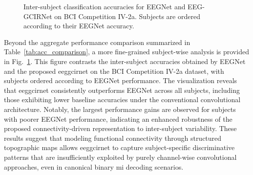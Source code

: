 \begin{figure}[htbp]
{
}
\caption{{Inter-subject classification accuracies for EEGNet and EEG-GCIRNet on BCI Competition IV-2a. Subjects are ordered according to their EEGNet accuracy.}}
\label{fig:acc_eegnet_vs_eegcirnet_bcic2a}
\end{figure}

Beyond the aggregate performance comparison summarized in Table~\ref{tab:acc_comparison}, a more fine-grained subject-wise analysis is provided in Fig.~\ref{fig:acc_eegnet_vs_eegcirnet_bcic2a}. This figure contrasts the inter-subject accuracies obtained by EEGNet and the proposed \gls{eeggcirnet} on the BCI Competition IV-2a dataset, with subjects ordered according to EEGNet performance. The visualization reveals that \gls{eeggcirnet} consistently outperforms EEGNet across all subjects, including those exhibiting lower baseline accuracies under the conventional convolutional architecture. Notably, the largest performance gains are observed for subjects with poorer EEGNet performance, indicating an enhanced robustness of the proposed connectivity-driven representation to inter-subject variability. These results suggest that modeling functional connectivity through structured topographic maps allows \gls{eeggcirnet} to capture subject-specific discriminative patterns that are insufficiently exploited by purely channel-wise convolutional approaches, even in canonical binary \gls{mi} decoding scenarios.

